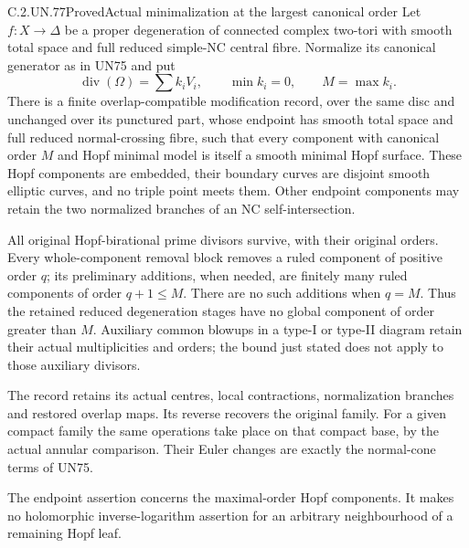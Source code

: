 \begin{statement}{C.2.UN.77}{Proved}{Actual minimalization at the largest canonical order}
Let \(f:X\to\Delta\) be a proper degeneration of connected
complex two-tori with smooth total space and full reduced
simple-NC central fibre.  Normalize its canonical generator
as in UN75 and put
\[
        \operatorname{div}(\Omega)=\sum k_iV_i,\qquad
        \min k_i=0,\qquad M=\max k_i .
\tag{C.HM.1}
\]
There is a finite overlap-compatible modification record,
over the same disc and unchanged over its punctured part,
whose endpoint has smooth total space and full reduced
normal-crossing fibre, such that every component with
canonical order \(M\) and Hopf minimal model is itself a
smooth minimal Hopf surface.  These Hopf components are
embedded, their boundary curves are disjoint smooth
elliptic curves, and no triple point meets them.
Other endpoint components may retain the two normalized
branches of an NC self-intersection.

All original Hopf-birational prime divisors survive, with
their original orders.  Every whole-component removal block
removes a ruled component of positive order \(q\);
its preliminary additions, when needed, are finitely many
ruled components of order \(q+1\le M\).  There are no such
additions when \(q=M\).  Thus the retained reduced degeneration stages have
no global component of order greater than \(M\).
Auxiliary common blowups in a type-I or type-II diagram
retain their actual multiplicities and orders; the bound
just stated does not apply to those auxiliary divisors.

The record retains its actual centres, local contractions,
normalization branches and restored overlap maps.  Its
reverse recovers the original family.  For a given compact
family the same operations take place on that compact
base, by the actual annular comparison.  Their Euler
changes are exactly the normal-cone terms of UN75.

The endpoint assertion concerns the maximal-order Hopf
components.  It makes no holomorphic inverse-logarithm
assertion for an arbitrary neighbourhood of a remaining
Hopf leaf.
\end{statement}

